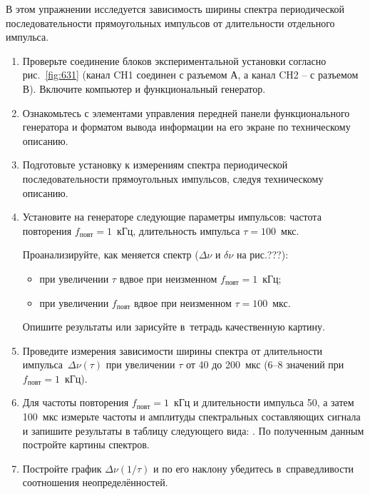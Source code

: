 \begin{lab:task}

В этом упражнении исследуется зависимость ширины спектра периодической последовательности прямоугольных импульсов от длительности отдельного импульса.

\begin{enumerate}
	\item Проверьте соединение блоков экспериментальной установки согласно рис.~\ref{fig:631}
 (канал CH1 соединен с разъемом А, а канал CH2 – с разъемом В). Включите компьютер и функциональный генератор.
	\item Ознакомьтесь с элементами управления передней панели функционального генератора и форматом вывода информации на его экране по техническому описанию.
	\item Подготовьте установку к измерениям спектра периодической последовательности прямоугольных импульсов, следуя техническому описанию.
	\item Установите на генераторе следующие параметры импульсов: частота повторения $f_\text{повт}=1$~кГц, длительность импульса $\tau=100$~мкс.

	Проанализируйте, как меняется спектр ($\Delta\nu$ и $\delta\nu$ на рис.???):
	\begin{itemize}
		\item при увеличении $\tau$ вдвое при неизменном $f_{\text{повт}}=1$~кГц;
		\item  при увеличении $f_\text{повт}$ вдвое при неизменном $\tau=100$~мкс.
	\end{itemize}

	Опишите результаты или зарисуйте в~тетрадь качественную картину.

%
	\item Проведите измерения зависимости ширины спектра от длительности импульса~$\Delta \nu(\tau)$ при увеличении $\tau$ от 40 до 200~мкс (6--8 значений при $f_\text{повт}=1$~кГц).
	\item Для частоты повторения $f_\text{повт} = 1$~кГц и длительности импульса 50, а затем 100~мкс измерьте частоты и амплитуды спектральных составляющих сигнала и запишите результаты в таблицу следующего вида: . По полученным данным постройте картины спектров.
	\item Постройте график $\Delta \nu(1/\tau)$ и по его наклону убедитесь в~справедливости соотношения неопределённостей.
\end{enumerate}


\end{lab:task}
